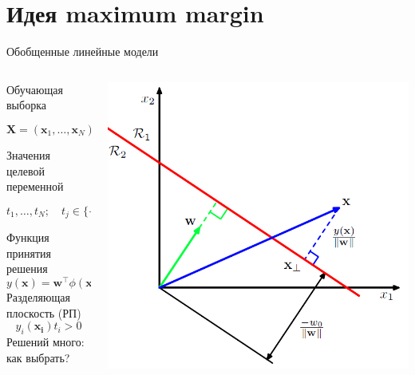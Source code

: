 \documentclass[10pt,a4paper]{beamer}
\begin{document}

\section{Идея maximum margin}


\begin{frame}{Обобщенные линейные модели}

\begin{columns}[T]
    \begin{column}{.5\textwidth}
    Обучающая выборка
    
	$$\mathbf{X} = (\mathbf{x}_1, \ldots, \mathbf{x}_N)$$
	
	Значения целевой переменной	
	
	$$t_1, \ldots, t_N; \quad t_j \in \{-1, +1\}$$
	    
    Функция принятия решения
    \[
    y(\mathbf{x}) = \mathbf{w}^\top \phi(\mathbf{x}) + b
    \]
    Разделяющая плоскость (РП)
    \[
    y_i(\mathbf{x_i}) t_i > 0
    \]
    Решений много: как выбрать?
    \end{column}
       
    \begin{column}{.5\textwidth}
    \vspace{-0em}
	\begin{center}
   		\includegraphics[scale=0.3]{images/linear.png}
    \end{center}
    \end{column}
  \end{columns}
  
\end{frame}
\end{document}
